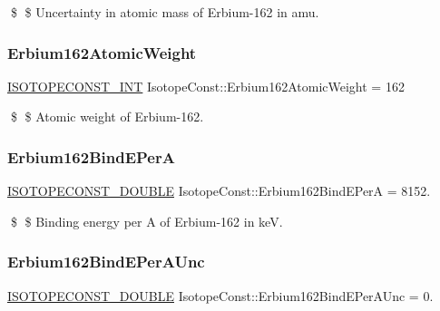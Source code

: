 \$ \$ Uncertainty in atomic mass of Erbium-\/162 in amu. \mbox{\label{group___isotope_const-_erbium-_er162_gaff0d570db7746d2c011dcb2c40459f57}} 
\subsubsection{\texorpdfstring{Erbium162\+Atomic\+Weight}{Erbium162AtomicWeight}}
{\footnotesize\ttfamily \mbox{\hyperlink{group___isotope_const-_macros_ga5f18360b3e99483a35c32d789e62621c}{I\+S\+O\+T\+O\+P\+E\+C\+O\+N\+S\+T\+\_\+\+I\+NT}} Isotope\+Const\+::\+Erbium162\+Atomic\+Weight = 162}

\$ \$ Atomic weight of Erbium-\/162. \mbox{\label{group___isotope_const-_erbium-_er162_ga0c2c4d7b0bb4e89f2f0c038cdde35d39}} 
\subsubsection{\texorpdfstring{Erbium162\+Bind\+E\+PerA}{Erbium162BindEPerA}}
{\footnotesize\ttfamily \mbox{\hyperlink{group___isotope_const-_macros_ga8f45a7272ce02c0b4c65c44636ed719a}{I\+S\+O\+T\+O\+P\+E\+C\+O\+N\+S\+T\+\_\+\+D\+O\+U\+B\+LE}} Isotope\+Const\+::\+Erbium162\+Bind\+E\+PerA = 8152.}

\$ \$ Binding energy per A of Erbium-\/162 in keV. \mbox{\label{group___isotope_const-_erbium-_er162_gaebc7203e941617d3201007d3fa4914c1}} 
\subsubsection{\texorpdfstring{Erbium162\+Bind\+E\+Per\+A\+Unc}{Erbium162BindEPerAUnc}}
{\footnotesize\ttfamily \mbox{\hyperlink{group___isotope_const-_macros_ga8f45a7272ce02c0b4c65c44636ed719a}{I\+S\+O\+T\+O\+P\+E\+C\+O\+N\+S\+T\+\_\+\+D\+O\+U\+B\+LE}} Isotope\+Const\+::\+Erbium162\+Bind\+E\+Per\+A\+Unc = 0.}

